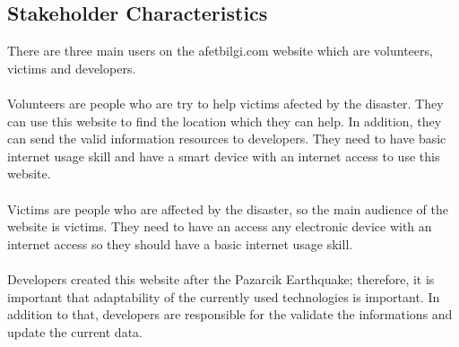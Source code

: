 \subsection{Stakeholder Characteristics}

There are three main users on the afetbilgi.com website which are volunteers, victims and developers. \\~\\
Volunteers are people who are try to help victims afected by the disaster. They can use this website to find the location which they can help. In addition, they can send the valid information resources to developers. They need to have basic internet usage skill and have a smart device with an internet access to use this website.\\~\\
Victims are people who are affected by the disaster, so the main audience of the website is victims. They need to have an access any electronic device with an internet access so they should have a basic internet usage skill. \\~\\
Developers created this website after the Pazarcik Earthquake; therefore, it is important that adaptability of the currently used technologies is important. In addition to that, developers are responsible for the validate the informations and update the current data. \\~\\

